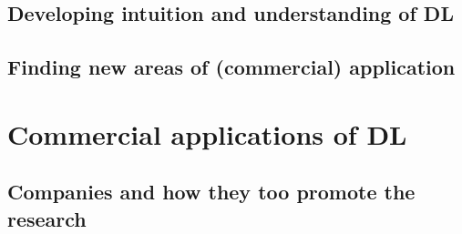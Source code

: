 \documentclass[a4paper]{report}
\begin{document}
	\subsection{Developing intuition and understanding of DL}
	\subsection{Finding new areas of (commercial) application}
\section{Commercial applications of DL}
	\subsection{Companies and how they too promote the research}
	
	
	
	
\end{document}
